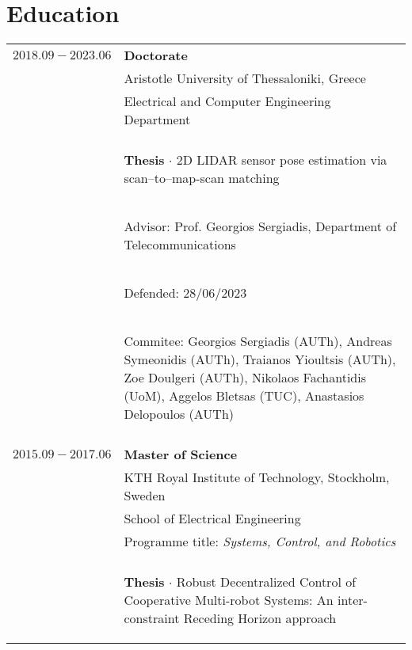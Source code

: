 \documentclass[a4paper,10pt,twoside]{article}
\begin{document}
\vspace*{\fill}
\section{Education}

\begin{tabular}{rp{11cm}}
$2018.09 - 2023.06$  & \textbf{Doctorate} \\
                     & Aristotle University of Thessaloniki, Greece \\
                     & Electrical and Computer Engineering Department \\
                     & \\
                     & \begin{small}\textbf{Thesis} $\cdot$ 2D LIDAR sensor pose estimation via scan--to--map-scan matching \end{small} \\
                     & \begin{small}Advisor: Prof. Georgios Sergiadis, Department of Telecommunications\end{small} \\
                     & \begin{small}Defended: 28/06/2023\end{small}\\
                     & \begin{small}Commitee: Georgios Sergiadis (AUTh),
                     Andreas Symeonidis (AUTh), Traianos Yioultsis (AUTh),
                     Zoe Doulgeri (AUTh), Nikolaos Fachantidis (UoM), Aggelos Bletsas (TUC), Anastasios Delopoulos (AUTh) \end{small}\\
&\\
$2015.09 - 2017.06$  & \textbf{Master of Science} \\
                     & KTH Royal Institute of Technology, Stockholm, Sweden\\
                     & School of Electrical Engineering\\
                     & Programme title: \textit{Systems, Control, and Robotics} \\
                     & \\
                     & \begin{small}\textbf{Thesis} $\cdot$ Robust Decentralized Control of Cooperative Multi-robot Systems:
                       An inter-constraint Receding Horizon approach\end{small} \\

\end{tabular}
\end{document}
